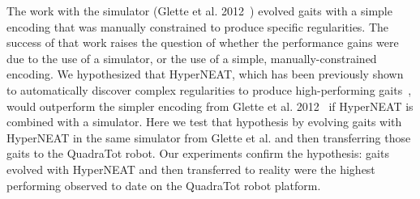 The work with the simulator (Glette et al. 2012~\cite{glette}) evolved gaits with a simple encoding that was manually constrained to produce specific regularities. The success of that work raises the question of whether the performance gains were due to the use of a simulator, or the use of a simple, manually-constrained encoding. We hypothesized that HyperNEAT, which has been previously shown to automatically discover complex regularities to produce high-performing gaits~\cite{clune2011performance,yos:clune}, would outperform the simpler encoding from Glette et al. 2012~\cite{glette} if HyperNEAT is combined with a simulator. 
Here we test that hypothesis by evolving gaits with HyperNEAT in the same simulator from Glette et al. and then transferring those gaits to the QuadraTot robot.  Our experiments confirm the hypothesis: gaits evolved with HyperNEAT and then transferred to reality were the highest performing observed to date on the QuadraTot robot platform. 




